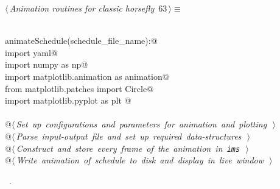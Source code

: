 \documentclass[11.5pt]{report}
\begin{document}
\begin{flushleft} \small
\begin{minipage}{\linewidth}\label{scrap91}\raggedright\small
{} $\langle\,${\itshape Animation routines for classic horsefly}\nobreak\ {\footnotesize {63}}$\,\rangle\equiv$
\vspace{-1ex}
\begin{list}{}{} \item
\mbox{}\verb@@\\
\mbox{}\verb@def animateSchedule(schedule_file_name):@\\
\mbox{}\verb@     import yaml@\\
\mbox{}\verb@     import numpy as np@\\
\mbox{}\verb@     import matplotlib.animation as animation@\\
\mbox{}\verb@     from matplotlib.patches import Circle@\\
\mbox{}\verb@     import matplotlib.pyplot as plt @\\
\mbox{}\verb@@\\
\mbox{}\verb@     @\hbox{$\langle\,${\itshape Set up configurations and parameters for animation and plotting}\nobreak\ {\footnotesize {}}$\,\rangle$}\verb@@\\
\mbox{}\verb@     @\hbox{$\langle\,${\itshape Parse input-output file and set up required data-structures}\nobreak\ {\footnotesize {}}$\,\rangle$}\verb@@\\
\mbox{}\verb@     @\hbox{$\langle\,${\itshape Construct and store every frame of the animation in \verb|ims|}\nobreak\ {\footnotesize {}}$\,\rangle$}\verb@@\\
\mbox{}\verb@     @\hbox{$\langle\,${\itshape Write animation of schedule to disk and display in live window}\nobreak\ {\footnotesize {}}$\,\rangle$}\verb@@\\
\mbox{}\verb@@{\NWsep}
\end{list}
\vspace{-1.5ex}
\footnotesize
\begin{list}{}{\setlength{\itemsep}{-\parsep}\setlength{\itemindent}{-\leftmargin}}
\item \NWtxtMacroRefIn\ .

\item{}
\end{list}
\end{minipage}\vspace{4ex}
\end{flushleft}
\end{document}
